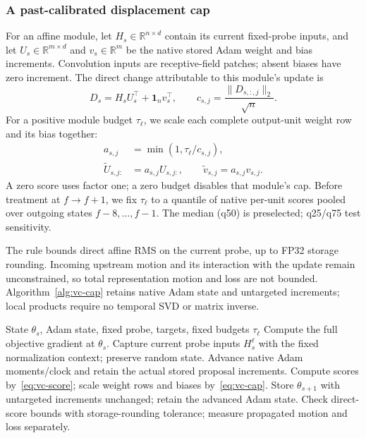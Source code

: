 \subsubsection{A past-calibrated displacement cap}
For an affine module, let $H_s\in\mathbb{R}^{n\times d}$ contain its current
fixed-probe inputs, and let $U_s\in\mathbb{R}^{m\times d}$ and
$v_s\in\mathbb{R}^{m}$ be the native stored Adam weight and bias increments.
Convolution inputs are receptive-field patches; absent biases have zero increment.
The direct change attributable to this module's update is
\begin{equation}
 D_s=H_sU_s^\top+\mathbf{1}_n v_s^\top,\qquad
 c_{s,j}=\frac{\|D_{s,:,j}\|_2}{\sqrt{n}}.
 \label{eq:vc-score}
\end{equation}
For a positive module budget $\tau_\ell$, we scale each complete output-unit
weight row and its bias together:
\begin{equation}
 \begin{split}
 a_{s,j}&=\min(1,\tau_\ell/c_{s,j}),\\
 \widetilde U_{s,j:}&=a_{s,j}U_{s,j:},\qquad
 \widetilde v_{s,j}=a_{s,j}v_{s,j}.
 \end{split}
 \label{eq:vc-cap}
\end{equation}
A zero score uses factor one; a zero budget disables that module's cap.
Before treatment at $f\to f+1$, we fix $\tau_\ell$ to a quantile of native
per-unit scores pooled over outgoing states $f-8,\ldots,f-1$.
The median (q50) is preselected; q25/q75 test sensitivity.

The rule bounds direct affine RMS on the current probe, up to FP32 storage
rounding. Incoming upstream motion and its interaction with the update remain
unconstrained, so total representation motion and loss are not bounded.
Algorithm~\ref{alg:vc-cap} retains native Adam state and untargeted increments;
local products require no temporal SVD or matrix inverse.

\begin{algorithm}[!b]
\caption{Past-calibrated local displacement cap}
\label{alg:vc-cap}
\begin{algorithmic}[1]
\Require State $\theta_s$, Adam state, fixed probe, targets, fixed budgets $\tau_\ell$
\State Compute the full objective gradient at $\theta_s$.
\State Capture current probe inputs $H_s^\ell$ with the fixed normalization context; preserve random state.
\State Advance native Adam moments/clock and retain the actual stored proposal increments.
  \State Compute scores by~\eqref{eq:vc-score}; scale weight rows and biases by~\eqref{eq:vc-cap}.
\EndFor
\State Store $\theta_{s+1}$ with untargeted increments unchanged; retain the advanced Adam state.
\State Check direct-score bounds with storage-rounding tolerance; measure propagated motion and loss separately.
\end{algorithmic}
\end{algorithm}

